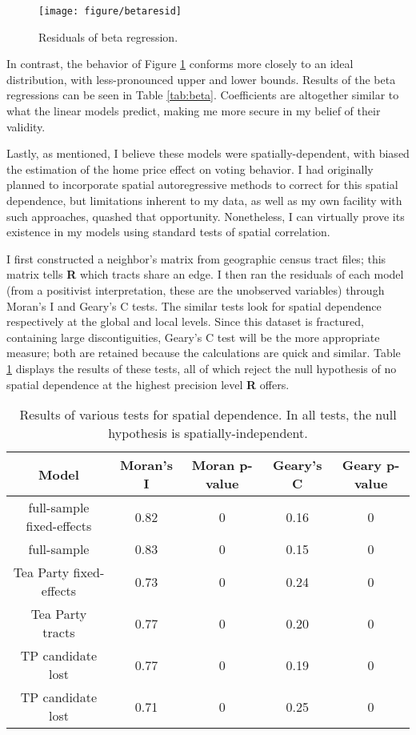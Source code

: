 \documentclass[
]{article}
\begin{document}
\begin{figure}

{\centering \texttt{[image: figure/betaresid]}

}

\caption{Residuals of beta regression.}\label{fig:betaresid}
\end{figure}

In contrast, the behavior of Figure \ref{fig:betaresid} conforms more closely to an ideal distribution, with less-pronounced upper and lower bounds.
Results of the beta regressions can be seen in Table \ref{tab:beta}.
Coefficients are altogether similar to what the linear models predict, making me more secure in my belief of their validity.

Lastly, as mentioned, I believe these models were spatially-dependent, with biased the estimation of the home price effect on voting behavior.
I had originally planned to incorporate spatial autoregressive methods to correct for this spatial dependence, but limitations inherent to my data, as well as my own facility with such approaches, quashed that opportunity.
Nonetheless, I can virtually prove its existence in my models using standard tests of spatial correlation.

I first constructed a neighbor's matrix from geographic census tract files; this matrix tells \textbf{R} which tracts share an edge.
I then ran the residuals of each model (from a positivist interpretation, these are the unobserved variables) through Moran's I and Geary's C tests.
The similar tests look for spatial dependence respectively at the global and local levels.
Since this dataset is fractured, containing large discontiguities, Geary's C test will be the more appropriate measure; both are retained because the calculations are quick and similar.
Table \ref{tab:spdep} displays the results of these tests, all of which reject the null hypothesis of no spatial dependence at the highest precision level \textbf{R} offers.

\begin{table}

\caption{\label{tab:spdep}Results of various tests for spatial dependence. In all tests, the null hypothesis is spatially-independent.}
\centering
\begin{tabular}[t]{ccccc}
\toprule
Model & Moran's I & Moran p-value & Geary's C & Geary p-value\\
\midrule
full-sample fixed-effects & 0.82 & 0 & 0.16 & 0\\
full-sample & 0.83 & 0 & 0.15 & 0\\
Tea Party fixed-effects & 0.73 & 0 & 0.24 & 0\\
Tea Party tracts & 0.77 & 0 & 0.20 & 0\\
TP candidate lost & 0.77 & 0 & 0.19 & 0\\
\addlinespace
TP candidate lost & 0.71 & 0 & 0.25 & 0\\
\bottomrule
\end{tabular}
\end{table}
\end{document}
